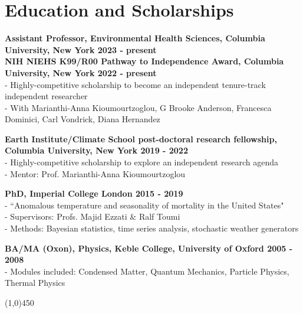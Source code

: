 \section*{Education and Scholarships}

\textbf{Assistant Professor, Environmental Health Sciences, Columbia University, New York \hfill 2023 - present}\\

\noindent \textbf{NIH NIEHS K99/R00 Pathway to Independence Award, Columbia University, New York \hfill 2022 - present}\\
- Highly-competitive scholarship to become an independent tenure-track independent researcher\\
- With Marianthi-Anna Kioumourtzoglou, G Brooke Anderson, Francesca Dominici, Carl Vondrick, Diana Hernandez \bigskip

\noindent \textbf{Earth Institute/Climate School post-doctoral research fellowship, Columbia University, New York \hfill 2019 - 2022}\\
- Highly-competitive scholarship to explore an independent research agenda\\
- Mentor: Prof. Marianthi-Anna Kioumourtzoglou \bigskip

\noindent \textbf{PhD, Imperial College London \hfill 2015 - 2019}\\
- ``Anomalous temperature and seasonality of mortality in the United States"\\	 		
- Supervisors: Profs. Majid Ezzati \& Ralf Toumi\\
- Methods: Bayesian statistics, time series analysis, stochastic weather generators \bigskip

\noindent \textbf{BA/MA (Oxon), Physics, Keble College, University of Oxford \hfill 2005 - 2008}\\
- Modules included: Condensed Matter,  Quantum Mechanics, Particle Physics, Thermal Physics		                             
\begin{center} \line(1,0){450} \end{center}